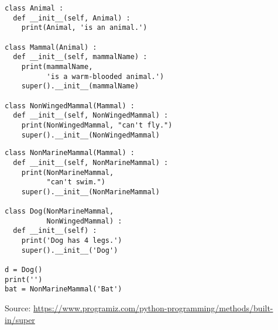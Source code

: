\begin{frame}[fragile]
%
\begin{tcbraster}[raster columns=2,
                  raster equal height,
                  nobeforeafter,
                  raster column skip=0.5cm]
\begin{codebox}
\begin{verbatim}
class Animal :
  def __init__(self, Animal) :
    print(Animal, 'is an animal.')
    
class Mammal(Animal) :
  def __init__(self, mammalName) :
    print(mammalName, 
          'is a warm-blooded animal.')
    super().__init__(mammalName)

class NonWingedMammal(Mammal) :
  def __init__(self, NonWingedMammal) :
    print(NonWingedMammal, "can't fly.")
    super().__init__(NonWingedMammal)
\end{verbatim}
\end{codebox}
%
\begin{codebox}[... (continued)]
\begin{verbatim}
class NonMarineMammal(Mammal) :
  def __init__(self, NonMarineMammal) :
    print(NonMarineMammal, 
          "can't swim.")
    super().__init__(NonMarineMammal)
    
class Dog(NonMarineMammal,
          NonWingedMammal) :
  def __init__(self) :
    print('Dog has 4 legs.')
    super().__init__('Dog')

d = Dog()
print('')
bat = NonMarineMammal('Bat')
\end{verbatim}
\end{codebox}
\end{tcbraster}
%
\begin{center}
	\scriptsize
	Source:
	\url{https://www.programiz.com/python-programming/methods/built-in/super}
\end{center}
%
\end{frame}


